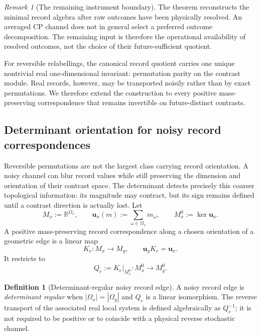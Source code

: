 \documentclass[11pt]{article}
\theoremstyle{definition}
\newtheorem{definition}[theorem]{Definition}
\theoremstyle{remark}
\newtheorem{remark}[theorem]{Remark}
\newcommand{\R}{\mathbb R}
\begin{document}
\begin{remark}[The remaining instrument boundary]
The theorem reconstructs the minimal record algebra after raw outcomes have
been physically resolved.  An averaged CP channel does not in general select
a preferred outcome decomposition.  The remaining input is therefore the
operational availability of resolved outcomes, not the choice of their
future-sufficient quotient.
\end{remark}

For reversible relabellings, the canonical record quotient carries one unique
nontrivial real one-dimensional invariant: permutation parity on the contrast
module.  Real records, however, may be transported noisily rather than by exact
permutations.  We therefore extend the construction to every positive
mass-preserving correspondence that remains invertible on future-distinct
contrasts.

\subsection{Determinant orientation for noisy record correspondences}
\label{subsec:noisy-record-orientation}

Reversible permutations are not the largest class carrying record orientation.
A noisy channel can blur record values while still preserving the dimension and
orientation of their contrast space.  The determinant detects precisely this
coarser topological information: its magnitude may contract, but its sign remains
defined until a contrast direction is actually lost.
Let
\[
 M_x:=\R^{\Omega_x},
 \qquad
 \mathbf u_x(m):=\sum_{\omega\in\Omega_x}m_\omega,
 \qquad
 M_x^0:=\ker\mathbf u_x.
\]
A positive mass-preserving record correspondence along a chosen orientation of
a geometric edge is a linear map
\[
 K_e:M_x\longrightarrow M_y,
 \qquad
 \mathbf u_yK_e=\mathbf u_x.
\]
It restricts to
\[
 Q_e:=K_e|_{M_x^0}:M_x^0\longrightarrow M_y^0.
\]

\begin{definition}[Determinant-regular noisy record edge]
\label{def:determinant-regular-record-edge}
A noisy record edge is \emph{determinant regular} when
$|\Omega_x|=|\Omega_y|$ and $Q_e$ is a linear isomorphism.  The reverse
transport of the associated real local system is defined algebraically as
$Q_e^{-1}$; it is not required to be positive or to coincide with a physical
reverse stochastic channel.
\end{definition}
\end{document}
